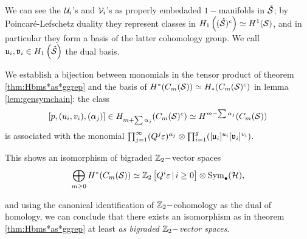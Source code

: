 
\begin{defn}
 \label{defn:dualHbasis}
We can see the $\mathcal{U}_i$'s and $\mathcal{V}_i$'s as properly embedaded $1-$manifolds in $\mathring{\mathcal{S}}$;
by Poincaré-Lefschetz duality they represent classes in $H_1\left((\mathring{\mathcal{S}})^c\right)\simeq H^1(\mathcal{S})$,
and in particular they form a basis
of the latter cohomology group. We call $\mathfrak{u}_i,\mathfrak{v}_i\in H_1\left(\mathring{\mathcal{S}}\right)$ the dual basis.

\end{defn}
We establish a bijection between monomials in the tensor product of theorem  \ref{thm:Hbms*as*ggrep}
and the basis of $H^*(C_m(\mathcal{S}))\simeq H_*(C_m(\mathcal{S})^c)$ in lemma \ref{lem:gensymchain}:
the class 
\[
[p,(u_i,v_i),(\alpha_j)]\in H_{m+\sum\alpha_j}(C_m(\mathcal{S})^c)\simeq H^{m-\sum\alpha_j}(C_m(\mathcal{S}))
\]
is associated with the monomial $\prod_{j=1}^{\infty}(Q^j\varepsilon)^{\alpha_j}\otimes \prod_{i=1}^g([\mathfrak{u}_i]^{u_i}[\mathfrak{v}_i]^{v_i})$.

This shows an isomorphism of bigraded $\mathbb{Z}_2-$vector spaces
\begin{equation}\label{eq:isovectorspaces}
  \bigoplus_{m\geq 0} H^*(C_m(\mathcal{S}))\simeq \mathbb{Z}_2\left[Q^i\varepsilon\,|\, i\geq 0\right]\otimes\operatorname{Sym}_{\bullet}(\mathcal{H}),
\end{equation}

and using the canonical identification of $\mathbb{Z}_2-$cohomology as the dual of homology, we can
conclude that there exists an isomorphism as in theorem \ref{thm:Hbms*as*ggrep}
at least \emph{as bigraded $\mathbb{Z}_2-$vector spaces}.

